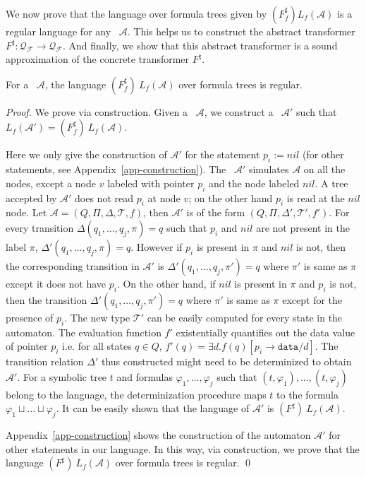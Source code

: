 \documentclass{llncs}
\newcommand{\A}{\mathcal{A}}
\newcommand{\data}{\texttt{data}}
\begin{document}
We now prove that the language over formula trees given by $(F_f^\sharp) L_f(\A)$ is a regular language for any \QSDA\ $\A$. This helps us to construct the abstract transformer $F^\sharp: \mathcal{Q_F} \rightarrow \mathcal{Q_F}$. And finally, we show that this abstract transformer is a sound approximation of the concrete transformer $F^\natural$.


\begin{lemma} \label{lemma-regular}
For a \QSDA\ $\mathcal{A}$, the language $(F_f^\sharp) ~L_f(\mathcal{A})$ over formula trees is regular.
\end{lemma}
\begin{proof}
We prove via construction. Given a \QSDA\ $\mathcal{A}$, we construct a \QSDA\ $\mathcal{A'}$ such that $L_f(\mathcal{A'}) = (F_f^\sharp) ~L_f(\mathcal{A})$.

Here we only give the construction of $\mathcal{A'}$ for the statement $p_i := nil$ (for other statements, see Appendix~\ref{app-construction}). The \QSDA\ $\mathcal{A'}$ simulates $\mathcal{A}$ on all the nodes, except a node $v$ labeled with pointer $p_i$ and the node labeled $nil$.
A tree accepted by $\mathcal{A'}$ does not read $p_i$ at node $v$; on the other hand $p_i$ is read at the $nil$ node.
Let $\mathcal{A} = (Q, \Pi, \Delta, \mathcal{T}, f)$, then $\mathcal{A'}$ is of the form $(Q, \Pi, \Delta', \mathcal{T'}, f')$. For every transition $\Delta(q_1, \ldots, q_j, \pi) =  q$ such that
$p_i$ and $nil$ are not present in the label $\pi$,  $\Delta'(q_1, \ldots, q_j, \pi) = q$.
However if $p_i$ is present in $\pi$ and $nil$ is not, then the corresponding transition in $\mathcal{A'}$ is $\Delta'(q_1, \ldots, q_j, \pi') = q$ where $\pi'$ is same as $\pi$ except it does not have $p_i$.
On the other hand, if $nil$ is present in $\pi$ and $p_i$ is not, then the transition $\Delta'(q_1, \ldots, q_j, \pi') = q$ where $\pi'$ is same as $\pi$ except for the presence of $p_i$.
The new type $\mathcal{T'}$ can be easily computed for every state in the automaton. The evaluation function $f'$ existentially quantifies out the data value of pointer $p_i$ i.e. for all states $q \in Q$, $f'(q) = \exists d. f(q)[p_i\rightarrow\data/d]$.
The transition relation $\Delta'$ thus constructed might need to be determinized to obtain $\mathcal{A'}$.
For a symbolic tree $t$ and formulas $\varphi_1, \ldots, \varphi_j$ such that $(t, \varphi_1), \ldots, (t, \varphi_j)$ belong to the language, the determinization procedure maps $t$ to the formula $\varphi_1 \sqcup \ldots \sqcup \varphi_j$.
It can be easily shown that the language of $\A'$ is $(F^\sharp)~L_f(\mathcal{A})$.

Appendix~\ref{app-construction} shows the construction of the automaton $\mathcal{A'}$ for other statements in our language. In this way, via construction, we prove that  the language $(F^\sharp)~L_f(\mathcal{A})$ over formula trees is regular.
\qed
\end{proof}
\end{document}
